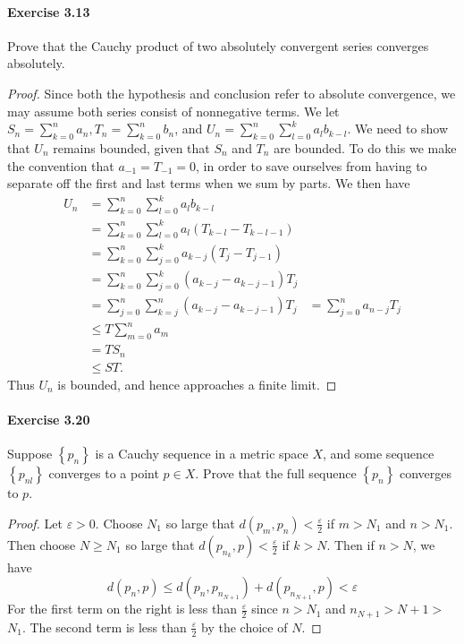 \documentclass{article}
\theoremstyle{definition}
\begin{document}
\paragraph{Exercise 3.13} Prove that the Cauchy product of two absolutely convergent series converges absolutely.
\begin{proof}
    Since both the hypothesis and conclusion refer to absolute convergence, we may assume both series consist of nonnegative terms. We let $S_n=\sum_{k=0}^n a_n, T_n=\sum_{k=0}^n b_n$, and $U_n=\sum_{k=0}^n \sum_{l=0}^k a_l b_{k-l}$. We need to show that $U_n$ remains bounded, given that $S_n$ and $T_n$ are bounded. To do this we make the convention that $a_{-1}=T_{-1}=0$, in order to save ourselves from having to separate off the first and last terms when we sum by parts. We then have
$$
\begin{aligned}
U_n &=\sum_{k=0}^n \sum_{l=0}^k a_l b_{k-l} \\
&=\sum_{k=0}^n \sum_{l=0}^k a_l\left(T_{k-l}-T_{k-l-1}\right) \\
&=\sum_{k=0}^n \sum_{j=0}^k a_{k-j}\left(T_j-T_{j-1}\right) \\
&=\sum_{k=0}^n \sum_{j=0}^k\left(a_{k-j}-a_{k-j-1}\right) T_j \\
&=\sum_{j=0}^n \sum_{k=j}^n\left(a_{k-j}-a_{k-j-1}\right) T_j
&=\sum_{j=0}^n a_{n-j} T_j \\
&\leq T \sum_{m=0}^n a_m \\
&=T S_n \\
&\leq S T .
\end{aligned}
$$
Thus $U_n$ is bounded, and hence approaches a finite limit.

\end{proof}



\paragraph{Exercise 3.20} Suppose $\left\{p_{n}\right\}$ is a Cauchy sequence in a metric space $X$, and some sequence $\left\{p_{n l}\right\}$ converges to a point $p \in X$. Prove that the full sequence $\left\{p_{n}\right\}$ converges to $p$.
\begin{proof}
    Let $\varepsilon>0$. Choose $N_1$ so large that $d\left(p_m, p_n\right)<\frac{\varepsilon}{2}$ if $m>N_1$ and $n>N_1$. Then choose $N \geq N_1$ so large that $d\left(p_{n_k}, p\right)<\frac{\varepsilon}{2}$ if $k>N$. Then if $n>N$, we have
$$
d\left(p_n, p\right) \leq d\left(p_n, p_{n_{N+1}}\right)+d\left(p_{n_{N+1}}, p\right)<\varepsilon
$$
For the first term on the right is less than $\frac{\varepsilon}{2}$ since $n>N_1$ and $n_{N+1}>N+1>$ $N_1$. The second term is less than $\frac{\varepsilon}{2}$ by the choice of $N$.
\end{proof}
\end{document}

